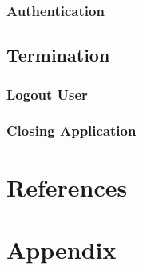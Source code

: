 \documentclass{article}
\begin{document}
            \subsubsection{Authentication}

        \subsection{Termination}
            \subsubsection{Logout User}

            \subsubsection{Closing Application}

    \section*{References}

    \appendix
    \section{Appendix}
\end{document}

